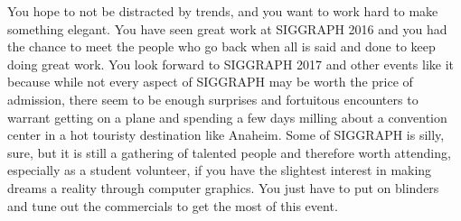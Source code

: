 \documentclass[../main.tex]{subfiles}
\begin{document}
You hope to not be distracted by trends, and you want to work hard to make something elegant. You have seen great work at SIGGRAPH 2016 and you had the chance to meet the people who go back when all is said and done to keep doing great work. You look forward to SIGGRAPH 2017 and other events like it because while not every aspect of SIGGRAPH may be worth the price of admission, there seem to be enough surprises and fortuitous encounters to warrant getting on a plane and spending a few days milling about a convention center in a hot touristy destination like Anaheim. Some of SIGGRAPH is silly, sure, but it is still a gathering of talented people and therefore worth attending, especially as a student volunteer, if you have the slightest interest in making dreams a reality through computer graphics. You just have to put on blinders and tune out the commercials to get the most of this event.
\end{document}
